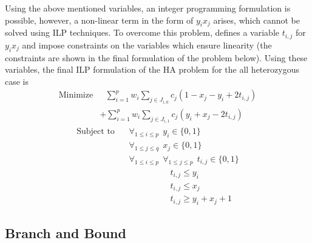\documentclass[10pt,twocolumn]{article}
\begin{document}
Using the above mentioned variables, an integer programming formulation is possible, however, a non-linear 
term in the form of $y_ix_j$ arises, which cannot be solved using ILP techniques. To overcome this problem, 
\cite{chen:2013} defines a variable $t_{i,j}$ for $y_ix_j$ and impose constraints on the variables which 
ensure linearity (the constraints are shown in the final formulation of the problem below). Using these 
variables, the final ILP formulation of the HA problem for the all heterozygous case is 
\begin{equation*}
\begin{split}
    \textrm{Minimize} 
    &\ \ \ \sum_{i = 1}^{p}{w_i} \sum_{j \in J_{i, 0} }^{}{c_j(1 - x_j - y_i + 2t_{i,j})}                 \\
    &+ \sum_{i = 1}^{p}{w_i} \sum_{j \in J_{i, 1}}^{}{c_j(y_i + x_j - 2t_{i,j})}                
\end{split}
\end{equation*}
\begin{equation*}
\begin{split}
    \textrm{Subject to} 
    &\ \ \ \ \forall_{1 \le i \le p} \ \ y_i \in \{0, 1\}                                                 \\
    &\ \ \ \ \forall_{1 \le j \le q} \ \ x_j \in \{0, 1\}                                                 \\
    &\ \ \ \ \forall_{1 \le i \le p} \ \ \forall_{1 \le j \le p} \ \ t_{i,j} \in \{0, 1\}                 \\
    &\ \ \ \ \ \ \ \ \ \ \ \ \ \ \ \ \ \ \ \ \ \ \ \ \ \ t_{i,j} \le y_i                                  \\ 
    &\ \ \ \ \ \ \ \ \ \ \ \ \ \ \ \ \ \ \ \ \ \ \ \ \ \ t_{i,j} \le x_j                                  \\ 
    &\ \ \ \ \ \ \ \ \ \ \ \ \ \ \ \ \ \ \ \ \ \ \ \ \ \ t_{i,j} \ge y_i + x_j + 1              
    \end{split}
\end{equation*}


\subsection{Branch and Bound} \label{sec:bnb}
\end{document}
